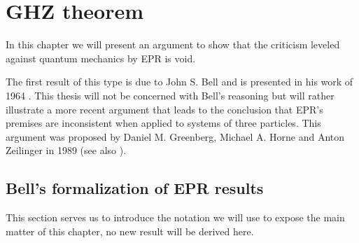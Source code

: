 \chapter{GHZ theorem}
\label{chap:ghz-theorem}
In this chapter we will present an argument to show that the criticism leveled against quantum mechanics by EPR is void.

The first result of this type is due to John S. Bell and is presented in his work of 1964 \cite{Bell1964}. This thesis will not be concerned with Bell's reasoning but will rather illustrate a more recent argument that leads to the conclusion that EPR's premises are inconsistent when applied to systems of three particles. This argument was proposed by Daniel M. Greenberg, Michael A. Horne and Anton Zeilinger in 1989 \cite{ghz1989} (see also \cite{:/content/aapt/journal/ajp/58/12/10.1119/1.16243}).


\section{Bell's formalization of EPR results}
This section serves us to introduce the notation we will use to expose the main matter of this chapter, no new result will be derived here.

